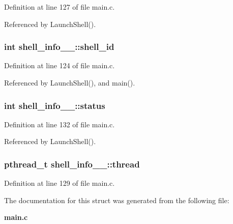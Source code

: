 Definition at line 127 of file main.c.

Referenced by Launch\-Shell().
\subsubsection{\setlength{\rightskip}{0pt plus 5cm}int {\bf shell\_\-info\_\-\_\-::shell\_\-id}}\label{structshell__info_____o0}




Definition at line 124 of file main.c.

Referenced by Launch\-Shell(), and main().
\subsubsection{\setlength{\rightskip}{0pt plus 5cm}int {\bf shell\_\-info\_\-\_\-::status}}\label{structshell__info_____o5}




Definition at line 132 of file main.c.

Referenced by Launch\-Shell().
\subsubsection{\setlength{\rightskip}{0pt plus 5cm}pthread\_\-t {\bf shell\_\-info\_\-\_\-::thread}}\label{structshell__info_____o3}




Definition at line 129 of file main.c.

The documentation for this struct was generated from the following file:\begin{CompactItemize}
\item 
{\bf main.c}\end{CompactItemize}
